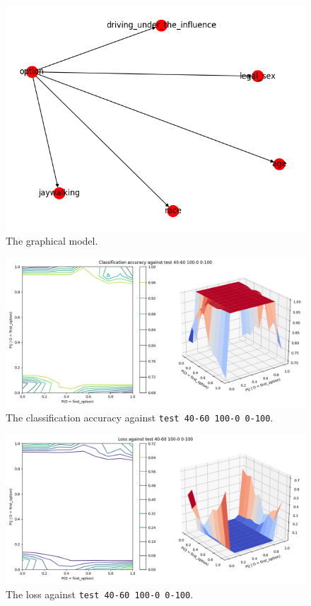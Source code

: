 \documentclass{report}
\newcommand{\code}{\texttt}
\begin{document}
\begin{figure}[h]
    \centering
    \includegraphics[scale=0.6]{figures/network.png}
    \caption[]{The graphical model.}
    \label{fig:graphical_model_image}
\end{figure}

% 
% 

\begin{figure}[h]
    \centering
    \includegraphics[width=\textwidth]{test_40-60_100-0_0-100_accuracy.png}
    \caption[]{The classification accuracy against \code{test 40-60 100-0 0-100}.}
    \label{fig:test_40-60_100-0_0-100_accuracy_plot}
\end{figure}

\begin{figure}[h]
    \centering
    \includegraphics[width=\textwidth]{test_40-60_100-0_0-100_loss.png}
    \caption[]{The loss against \code{test 40-60 100-0 0-100}.}
    \label{fig:test_40-60_100-0_0-100_loss_plot}
\end{figure}
\end{document}
